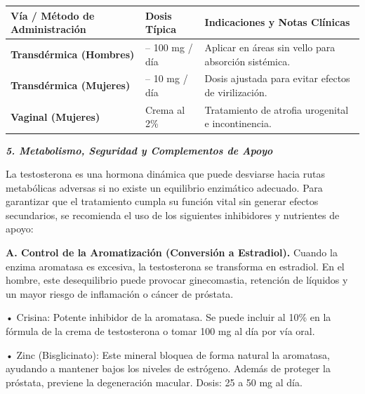\documentclass[
  spanish,
]{article}
\newcounter{none} %
\begin{document}
{\def\LTcaptype{none} %
\begin{longtable}[]{@{}
  >{\raggedright\arraybackslash}p{}
  >{\raggedright\arraybackslash}p{}
  >{\raggedright\arraybackslash}p{}@{}}
\toprule\noalign{}
\begin{minipage}[b]{\linewidth}\raggedright
Vía / Método de Administración
\end{minipage} & \begin{minipage}[b]{\linewidth}\raggedright
Dosis Típica
\end{minipage} & \begin{minipage}[b]{\linewidth}\raggedright
Indicaciones y Notas Clínicas
\end{minipage} \\
\midrule\noalign{}
\endhead
\bottomrule\noalign{}
\endlastfoot
\textbf{Transdérmica (Hombres)} & 40 -- 100 mg / día & Aplicar en áreas sin vello para absorción sistémica. \\
\textbf{Transdérmica (Mujeres)} & 2 -- 10 mg / día & Dosis ajustada para evitar efectos de virilización. \\
\textbf{Vaginal (Mujeres)} & Crema al 2\% & Tratamiento de atrofia urogenital e incontinencia. \\
\end{longtable}
}

\textbf{\emph{5. Metabolismo, Seguridad y Complementos de Apoyo}}

La testosterona es una hormona dinámica que puede desviarse hacia rutas metabólicas adversas si no existe un equilibrio enzimático adecuado. Para garantizar que el tratamiento cumpla su función vital sin generar efectos secundarios, se recomienda el uso de los siguientes inhibidores y nutrientes de apoyo:

\textbf{A. Control de la Aromatización (Conversión a Estradiol).}
Cuando la enzima aromatasa es excesiva, la testosterona se transforma en estradiol. En el hombre, este desequilibrio puede provocar ginecomastia, retención de líquidos y un mayor riesgo de inflamación o cáncer de próstata.

• Crisina: Potente inhibidor de la aromatasa. Se puede incluir al 10\% en la fórmula de la crema de testosterona o tomar 100 mg al día por vía oral.

• Zinc (Bisglicinato): Este mineral bloquea de forma natural la aromatasa, ayudando a mantener bajos los niveles de estrógeno. Además de proteger la próstata, previene la degeneración macular. Dosis: 25 a 50 mg al día.
\end{document}

